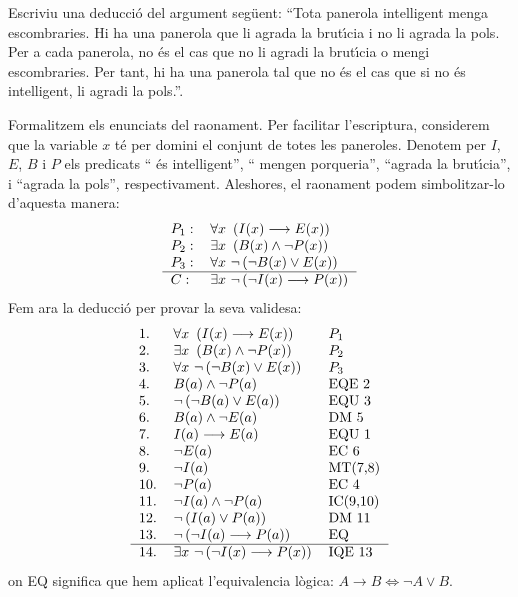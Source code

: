\begin{exer}
Escriviu una deducci\'{o} del argument seg\"{u}ent: \textquotedblleft Tota
panerola intel\textperiodcentered ligent menga escombraries. Hi ha una
panerola que li agrada la brut\'{\i}cia i no li agrada la pols. Per a cada
panerola, no \'{e}s el cas que no li agradi la brut\'{\i}cia o mengi
escombraries. Per tant, hi ha una panerola tal que no \'{e}s el cas que si no
\'{e}s intel\textperiodcentered ligent, li agradi la pols.\textquotedblright.
\end{exer}

\begin{solucio}
Formalitzem els enunciats del raonament. Per facilitar l'escriptura,
considerem que la variable $x$ t\'{e} per domini el conjunt de totes les
paneroles. Denotem per $I$, $E$, $B$ i $P$ els predicats \textquotedblleft%
\'{e}s intel\textperiodcentered ligent\textquotedblright, \textquotedblleft
mengen porqueria\textquotedblright, \textquotedblleft agrada la
brut\'{\i}cia\textquotedblright, i \textquotedblleft agrada la
pols\textquotedblright, respectivament. Aleshores, el raonament podem
simbolitzar-lo d'aquesta manera:%
\[%
\begin{tabular}
[c]{ll}%
$P_{1}:$ & $\forall x~\left(  I(x)\longrightarrow E(x)\right)  $\\
$P_{2}:$ & $\exists x~\left(  B(x)\wedge\lnot P(x)\right)  $\\
$P_{3}:$ & $\forall x~\lnot\left(  \lnot B(x)\vee E(x)\right)  $\\\hline
$C:$ & $\exists x~\lnot\left(  \lnot I(x)\longrightarrow P(x)\right)  $%
\end{tabular}
\]
Fem ara la deducci\'{o} per provar la seva validesa:%
\[%
\begin{tabular}
[c]{lll}%
1. & $\forall x~\left(  I(x)\longrightarrow E(x)\right)  $ & $P_{1}$\\
2. & $\exists x~\left(  B(x)\wedge\lnot P(x)\right)  $ & $P_{2}$\\
3. & $\forall x~\lnot\left(  \lnot B(x)\vee E(x)\right)  $ & $P_{3}$\\
4. & $B(a)\wedge\lnot P(a)$ & EQE 2\\
5. & $\lnot\left(  \lnot B(a)\vee E(a)\right)  $ & EQU 3\\
6. & $B(a)\wedge\lnot E(a)$ & DM 5\\
7. & $I(a)\longrightarrow E(a)$ & EQU 1\\
8. & $\lnot E(a)$ & EC 6\\
9. & $\lnot I(a)$ & MT(7,8)\\
10. & $\lnot P(a)$ & EC 4\\
11. & $\lnot I(a)\wedge\lnot P(a)$ & IC(9,10)\\
12. & $\lnot\left(  I(a)\vee P(a)\right)  $ & DM 11\\
13. & $\lnot\left(  \lnot I(a)\longrightarrow P(a)\right)  $ & EQ\\\hline
14. & $\exists x~\lnot\left(  \lnot I(x)\longrightarrow P(x)\right)  $ & IQE
13
\end{tabular}
\]
on EQ significa que hem aplicat l'equivalencia l\`{o}gica: $A\longrightarrow
B\Longleftrightarrow\lnot A\vee B$.
\end{solucio}

